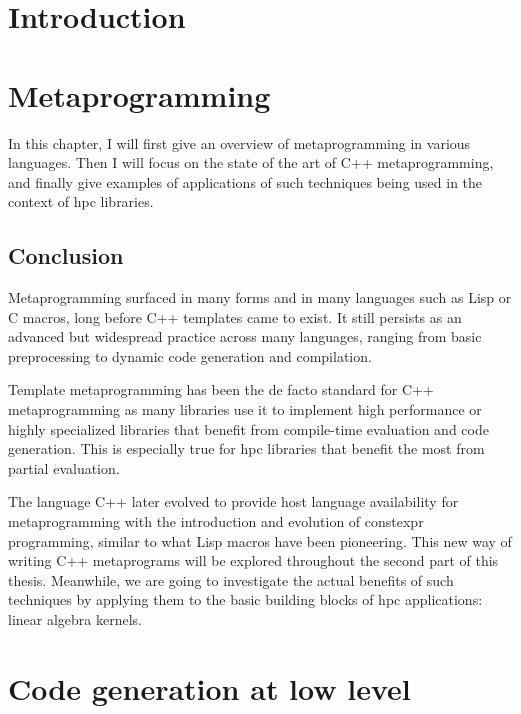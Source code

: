 \documentclass[english,12pt,a4paper]{book}
\providecommand{\cpp}{\textsc{C++}\xspace}
\begin{document}
\chapter*{
  Introduction
}



\chapter{
  Metaprogramming
}

In this chapter, I will first give an overview of metaprogramming in
various languages. Then I will focus on the state of the art
of \cpp metaprogramming, and finally give examples of applications
of such techniques being used in the context of \gls{hpc} libraries.




\section{
  Conclusion
}

Metaprogramming surfaced in many forms and in many languages such as Lisp or C
macros, long before \cpp templates came to exist.
It still persists as an advanced but widespread practice across many languages,
ranging from basic preprocessing to dynamic code generation and compilation.

Template metaprogramming has been the de facto standard for \cpp metaprogramming
as many libraries use it to implement high performance or highly specialized
libraries that benefit from compile-time evaluation and code generation.
This is especially true for \gls{hpc} libraries that benefit the most from
partial evaluation.

The language \cpp later evolved to provide host language availability for
metaprogramming with the introduction and evolution of \gls{constexpr}
programming, similar to what Lisp macros have been pioneering.
This new way of writing \cpp metaprograms will be explored throughout
the second part of this thesis. Meanwhile, we are going to investigate the
actual benefits of such techniques by applying them to the basic building blocks
of \gls{hpc} applications: linear algebra kernels.

\chapter{
  Code generation at low level
}
\end{document}
